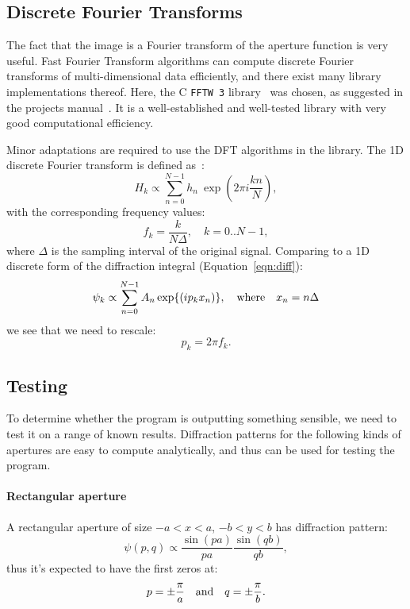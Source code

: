 \documentclass{article}
\newcommand{\CC}{{C\nolinebreak[4]\hspace{-.05em}\raisebox{.3ex}{\scriptsize\bf ++}}}
\begin{document}
\subsection{Discrete Fourier Transforms}\label{sec:analysis:dft}
The fact that the image is a Fourier transform of the aperture function is very useful. Fast Fourier Transform algorithms can compute discrete Fourier transforms of multi-dimensional data efficiently, and there exist many library implementations thereof. Here, the \CC{} \texttt{FFTW 3} library~\cite{fftw} was chosen, as suggested in the projects manual~\cite{manual}. It is a well-established and well-tested library with very good computational efficiency.

Minor adaptations are required to use the DFT algorithms in the library. The 1D discrete Fourier transform is defined as~\cite[Chapter 12.1]{NumRecipes}:
\begin{equation}
    H_k \propto \sum_{n=0}^{N-1} h_n\ \exp{\left( 2\pi{}i \frac{kn}{N} \right)},
\end{equation}
with the corresponding frequency values:
\begin{equation}\label{eqn:fk}
    f_k = \frac{k}{N \Delta},\quad k = 0..N-1,
\end{equation}
where $\Delta$ is the sampling interval of the original signal. Comparing to a 1D discrete form of the diffraction integral (Equation~\ref{eqn:diff}):
\begin{equation}
    \psi_k \propto \sum_{n=0}^{N-1} A_n \exp{\left( i p_k x_n \right)}, \qq{where} x_n = n \Delta
\end{equation}
we see that we need to rescale:
\begin{equation}
    p_k = 2\pi f_k.
\end{equation}

\subsection{Testing}\label{sec:analysis:test}
To determine whether the program is outputting something sensible, we need to test it on a range of known results. Diffraction patterns for the following kinds of apertures are easy to compute analytically, and thus can be used for testing the program.

\paragraph{Rectangular aperture} A rectangular aperture of size $-a < x < a$, $-b < y < b$ has diffraction pattern:
\begin{equation}
    \psi(p, q) \propto \frac{\sin{\left( pa \right)}}{pa} \frac{\sin{\left( qb \right)}}{qb},
\end{equation}
thus it's expected to have the first zeros at:
\begin{equation}\label{eqn:test_rect}
    p = \pm \frac{\pi}{a} \qq{and} q = \pm \frac{\pi}{b}.
\end{equation}
\end{document}
